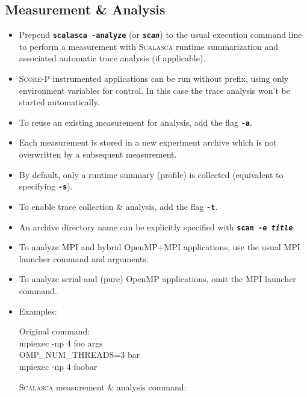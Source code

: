 \documentclass[a4paper]{article}
\newcommand{\Scalasca}{\textsc{Scalasca}\xspace}
\newcommand{\Scorep}{\textsc{Score-P}\xspace}
\begin{document}

\subsection*{Measurement \& Analysis}
\begin{itemize}
  \item Prepend \textbf{\texttt{scalasca -analyze}} (or \textbf{\texttt{\em scan}})
        to the usual execution command line to perform a measurement with
        \Scalasca runtime summarization and associated automatic trace analysis
        (if applicable).
  \item \Scorep instrumented applications can be run without prefix, using only
        environment variables for control. In this case the trace analysis won't
        be started automatically.
  \item To reuse an existing measurement for analysis, add the flag \textbf{\texttt{-a}}.
  \item Each measurement is stored in a new experiment archive
        which is not overwritten by a subsequent measurement.
  \item By default, only a runtime summary (profile) is collected
        (equivalent to specifying \textbf{\texttt{-s}}).
  \item To enable trace collection \& analysis, add the flag \textbf{\texttt{-t}}.
  \item An archive directory name can be explicitly specified with
        \textbf{\texttt{scan -e {\em title}}}.
  \item To analyze MPI and hybrid OpenMP+MPI applications,
        use the usual MPI launcher command and arguments.
  \item To analyze serial and (pure) OpenMP applications, omit the MPI launcher
        command.
  \item Examples:\\
    \begin{minipage}[t]{0.255\linewidth}
      Original command: \\\ttfamily
      mpiexec -np 4 foo args \\
      OMP\_NUM\_THREADS=3 bar \\
      mpiexec -np 4 foobar
    \end{minipage}
    \begin{minipage}[t]{0.5\linewidth}
      \Scalasca measurement \& analysis command: \\\ttfamily

\end{minipage}
\end{itemize}
\end{document}
